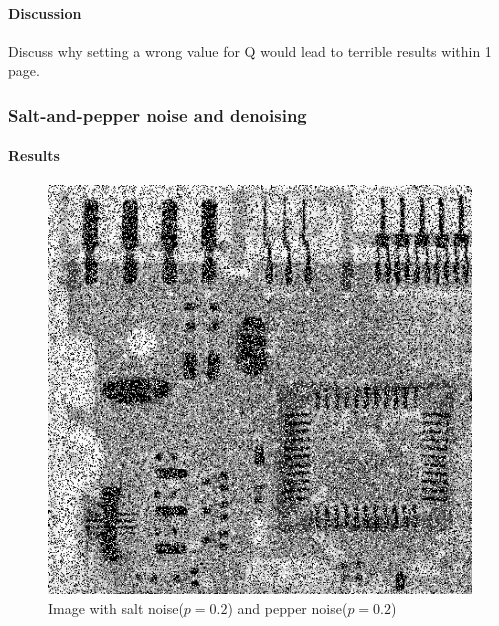\documentclass{article}
\begin{document}
\paragraph{Discussion}
Discuss why setting a wrong value for Q would lead to terrible results within 1 page.

\subsubsection{Salt-and-pepper noise and denoising}
\paragraph{Results}


\begin{figure}[H]
	\centering
	\includegraphics[width=336pt]{../result/task2/sap/sap-20-20.png}
	\caption{Image with salt noise($p=0.2$) and pepper noise($p=0.2$)}
	\label{fig:sap}
\end{figure}
\end{document}
